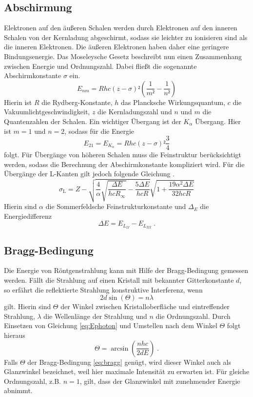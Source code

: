 \subsection{Abschirmung}
Elektronen auf den äußeren Schalen werden durch Elektronen auf den inneren Schalen von der Kernladung abgeschirmt, sodass sie leichter zu ionisieren sind als die inneren Elektronen. Die äußeren Elektronen haben daher eine geringere Bindungsenergie. Das Moseleysche Gesetz beschreibt nun einen Zusammenhang zwischen Energie und Ordnungszahl. Dabei fließt die sogenannte Abschirmkonstante $\sigma$ ein.
\begin{equation}
  E_{nm} = Rhc(z-\sigma)²(\frac{1}{m²} - \frac{1}{n²})
\end{equation}
Hierin ist $R$ die Rydberg-Konstante, $h$ das Plancksche Wirkungsquantum, $c$ die Vakuumlichtgeschwindigkeit, $z$ die Kernladungszahl und $n$ und $m$ die Quantenzahlen der Schalen. Ein wichtiger Übergang ist der $K_\alpha$ Übergang. Hier ist $m=1$ und $n=2$, sodass für die Energie
\begin{equation}
  E_{21} = E_{K_\alpha} = Rhc (z-\sigma)²\frac{3}{4}
  \label{eq:sigma_k}
\end{equation}
folgt. Für Übergänge von höheren Schalen muss die Feinstruktur berücksichtigt werden, sodass die Berechnung der Abschirmkonstante kompliziert wird. Für die Übergänge der L-Kanten gilt jedoch folgende Gleichung \cite{skript}.
\begin{equation}
\sigma_\text{L} = Z - \sqrt{\frac{4}{\alpha} \sqrt{\frac{\Delta
      E}{h c R_\infty}} - \frac{5 \Delta E}{h c R}} \sqrt{ 1
  + \frac{19 \alpha ^2 \Delta E}{32h c R}}
\label{eq:sigma_l}
\end{equation}
Hierin sind $\alpha$ die Sommerfeldsche Feinstrukturkonstante und $\Delta_E$ die Energiedifferenz
\begin{equation}
  \Delta E = E_{L_{II}} - E_{L_{III}} \; .
\end{equation}

\subsection{Bragg-Bedingung}
Die Energie von Röntgenstrahlung kann mit Hilfe der Bragg-Bedingung gemessen werden. Fällt die Strahlung auf einen Kristall mit bekannter Gitterkonstante $d$, so erfährt die reflektierte Strahlung konstruktive Interferenz, wenn
\begin{equation}
  2d\sin(\Theta) = n \lambda
  \label{eq:bragg}
\end{equation}
gilt. Hierin sind $\Theta$ der Winkel zwischen Kristalloberfläche und eintreffender Strahlung, $\lambda$ die Wellenlänge der Strahlung und $n$ die Ordnungszahl. Durch Einsetzen von Gleichung \ref{eq:Ephoton} und Umstellen nach dem Winkel $\Theta$ folgt hieraus
\begin{equation}
  \Theta = \arcsin\left(\frac{nhc}{2dE}\right) \; .
  \label{eq:Theta}
\end{equation}
Falls $\Theta$ der Bragg-Bedingung \eqref{eq:bragg} genügt, wird dieser Winkel auch als Glanzwinkel bezeichnet, weil hier maximale Intensität zu erwarten ist. Für gleiche Ordnungszahl, z.B. $n=1$, gilt, dass der Glanzwinkel mit zunehmender Energie abnimmt.



